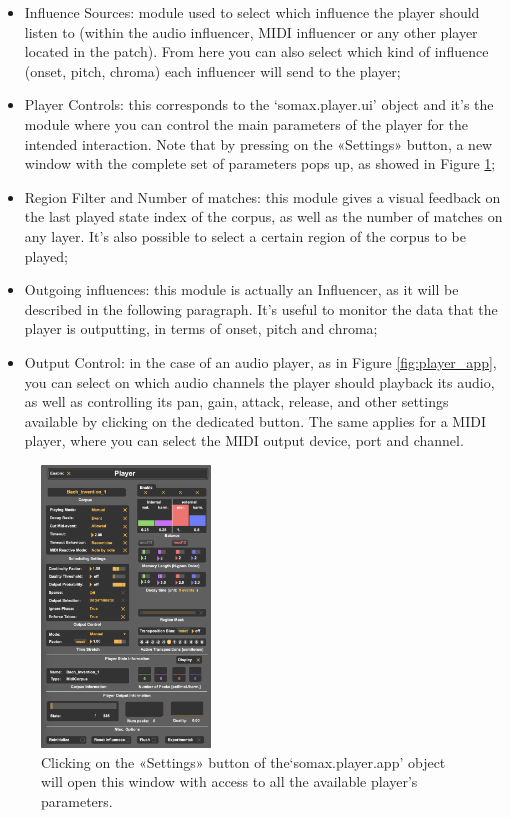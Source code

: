 \begin{itemize}
    \item Influence Sources: module used to select which influence the player should listen to (within the audio influencer, MIDI influencer or any other player located in the patch). From here you can also select which kind of influence (onset, pitch, chroma) each influencer will send to the player;
    \item Player Controls: this corresponds to the `somax.player.ui' object and it's the module where you can control the main parameters of the player for the intended interaction. Note that by pressing on the «Settings» button, a new window with the complete set of parameters pops up, as showed in Figure \ref{fig:player_settings};
    \item Region Filter and Number of matches: this module gives a visual feedback on the last played state index of the corpus, as well as the number of matches on any layer. It's also possible to select a certain region of the corpus to be played;
    \item Outgoing influences: this module is actually an Influencer, as it will be described in the following paragraph. It's useful to monitor the data that the player is outputting, in terms of onset, pitch and chroma;
    \item Output Control: in the case of an audio player, as in Figure \ref{fig:player_app}, you can select on which audio channels the player should playback its audio, as well as controlling its pan, gain, attack, release, and other settings available by clicking on the dedicated button. The same applies for a MIDI player, where you can select the MIDI output device, port and channel.
\end{itemize}

 \begin{figure}[H]
    \centering        
 	\includegraphics[width=0.4\textwidth, keepaspectratio]{img/player_settings.png}
    \caption{Clicking on the «Settings» button of the`somax.player.app' object will open this window with access to all the available player's parameters.}
    \label{fig:player_settings}
\end{figure}

